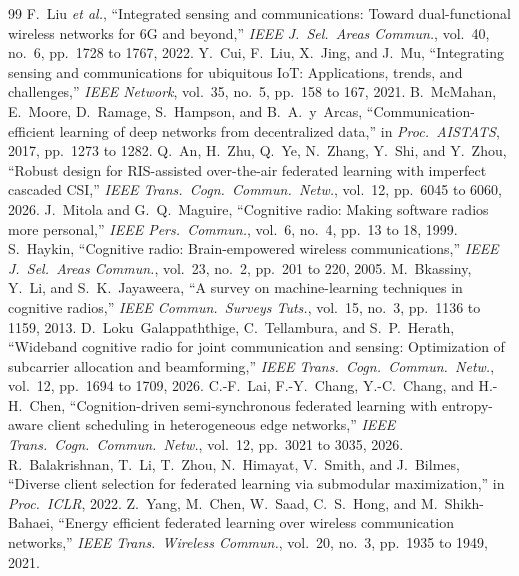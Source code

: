 \documentclass[lettersize,journal]{IEEEtran}
\begin{document}
\begin{thebibliography}{99}
 F.~Liu \emph{et al.}, ``Integrated sensing and communications: Toward dual-functional wireless networks for 6G and beyond,'' \emph{IEEE J.\ Sel.\ Areas Commun.}, vol.~40, no.~6, pp.~1728 to 1767, 2022.
 Y.~Cui, F.~Liu, X.~Jing, and J.~Mu, ``Integrating sensing and communications for ubiquitous IoT: Applications, trends, and challenges,'' \emph{IEEE Network}, vol.~35, no.~5, pp.~158 to 167, 2021.
 B.~McMahan, E.~Moore, D.~Ramage, S.~Hampson, and B.~A.~y~Arcas, ``Communication-efficient learning of deep networks from decentralized data,'' in \emph{Proc.\ AISTATS}, 2017, pp.~1273 to 1282.
 Q.~An, H.~Zhu, Q.~Ye, N.~Zhang, Y.~Shi, and Y.~Zhou, ``Robust design for RIS-assisted over-the-air federated learning with imperfect cascaded CSI,'' \emph{IEEE Trans.\ Cogn.\ Commun.\ Netw.}, vol.~12, pp.~6045 to 6060, 2026.
 J.~Mitola and G.~Q.~Maguire, ``Cognitive radio: Making software radios more personal,'' \emph{IEEE Pers.\ Commun.}, vol.~6, no.~4, pp.~13 to 18, 1999.
 S.~Haykin, ``Cognitive radio: Brain-empowered wireless communications,'' \emph{IEEE J.\ Sel.\ Areas Commun.}, vol.~23, no.~2, pp.~201 to 220, 2005.
 M.~Bkassiny, Y.~Li, and S.~K.~Jayaweera, ``A survey on machine-learning techniques in cognitive radios,'' \emph{IEEE Commun.\ Surveys Tuts.}, vol.~15, no.~3, pp.~1136 to 1159, 2013.
 D.~Loku~Galappaththige, C.~Tellambura, and S.~P.~Herath, ``Wideband cognitive radio for joint communication and sensing: Optimization of subcarrier allocation and beamforming,'' \emph{IEEE Trans.\ Cogn.\ Commun.\ Netw.}, vol.~12, pp.~1694 to 1709, 2026.
 C.-F.~Lai, F.-Y.~Chang, Y.-C.~Chang, and H.-H.~Chen, ``Cognition-driven semi-synchronous federated learning with entropy-aware client scheduling in heterogeneous edge networks,'' \emph{IEEE Trans.\ Cogn.\ Commun.\ Netw.}, vol.~12, pp.~3021 to 3035, 2026.
 R.~Balakrishnan, T.~Li, T.~Zhou, N.~Himayat, V.~Smith, and J.~Bilmes, ``Diverse client selection for federated learning via submodular maximization,'' in \emph{Proc.\ ICLR}, 2022.
 Z.~Yang, M.~Chen, W.~Saad, C.~S.~Hong, and M.~Shikh-Bahaei, ``Energy efficient federated learning over wireless communication networks,'' \emph{IEEE Trans.\ Wireless Commun.}, vol.~20, no.~3, pp.~1935 to 1949, 2021.

\end{thebibliography}
\end{document}
